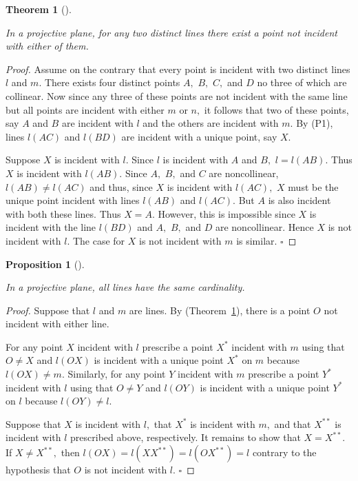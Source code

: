 \documentclass[
  twoside,
  12pt,
  letterpaper,
  fleqn]{article}
\theoremstyle{definition}
\theoremstyle{definition}
\theoremstyle{plain}
\newtheorem{proposition}{Proposition}[section]
\theoremstyle{plain}
\newtheorem{theorem}{Theorem}[section]
\theoremstyle{remark}
\begin{document}
\begin{theorem}[]\protect\hypertarget{thm-neitherone}{}\label{thm-neitherone}

In a projective plane, for any two distinct lines there exist a point
not incident with either of them.

\end{theorem}

\begin{proof}

Assume on the contrary that every point is incident with two distinct
lines \(l\) and \(m.\) There exists four distinct points \(A,\) \(B,\)
\(C,\) and \(D\) no three of which are collinear. Now since any three of
these points are not incident with the same line but all points are
incident with either \(m\) or \(n,\) it follows that two of these
points, say \(A\) and \(B\) are incident with \(l\) and the others are
incident with \(m.\) By (P1), lines \(l(AC)\) and \(l(BD)\) are incident
with a unique point, say \(X.\)

Suppose \(X\) is incident with \(l.\) Since \(l\) is incident with \(A\)
and \(B,\) \(l=l(AB).\) Thus \(X\) is incident with \(l(AB).\) Since
\(A,\) \(B,\) and \(C\) are noncollinear, \(l(AB)\neq l(AC)\) and thus,
since \(X\) is incident with \(l(AC),\) \(X\) must be the unique point
incident with lines \(l(AB)\) and \(l(AC).\) But \(A\) is also incident
with both these lines. Thus \(X=A.\) However, this is impossible since
\(X\) is incident with the line \(l(BD)\) and \(A,\) \(B,\) and \(D\)
are noncollinear. Hence \(X\) is not incident with \(l.\) The case for
\(X\) is not incident with \(m\) is similar. \(\square\)

\end{proof}

\begin{proposition}[]\protect\hypertarget{prp-probijection}{}\label{prp-probijection}

In a projective plane, all lines have the same cardinality.

\end{proposition}

\begin{proof}

Suppose that \(l\) and \(m\) are lines. By
(Theorem~\ref{thm-neitherone}), there is a point \(O\) not incident with
either line.

For any point \(X\) incident with \(l\) prescribe a point \(X^*\)
incident with \(m\) using that \(O\neq X\) and \(l(OX)\) is incident
with a unique point \(X^*\) on \(m\) because \(l(OX)\neq m.\) Similarly,
for any point \(Y\) incident with \(m\) prescribe a point \(Y^*\)
incident with \(l\) using that \(O\neq Y\) and \(l(OY)\) is incident
with a unique point \(Y^*\) on \(l\) because \(l(OY)\neq l.\)

Suppose that \(X\) is incident with \(l,\) that \(X^*\) is incident with
\(m,\) and that \(X^{**}\) is incident with \(l\) prescribed above,
respectively. It remains to show that \(X=X^{**}.\) If \(X\neq X^{**},\)
then \(l(OX)=l(XX^{**})=l(OX^{**})=l\) contrary to the hypothesis that
\(O\) is not incident with \(l.\) \(\square\)

\end{proof}
\end{document}
